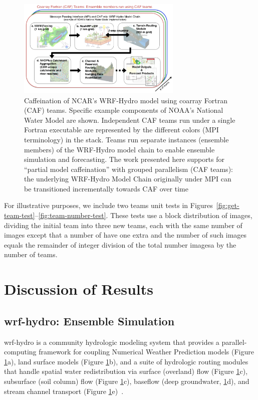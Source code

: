 \begin{figure}
\includegraphics[width=0.7\textwidth]{figures/WRF-Hydro-caf-ens-model_chain.png}
\vspace{-7pt}
\caption{Caffeination of NCAR's WRF-Hydro model using coarray Fortran (CAF)
  teams. Specific example components of  NOAA's National Water
  Model are shown. Independent CAF teams run under a single Fortran executable are represented by the different colors
  (MPI terminology) in the stack.  Teams run separate instances
  (ensemble members) of the WRF-Hydro model chain to enable ensemble
  simulation and forecasting. The work presented  here supports for ``partial model caffeination'' with grouped
  parallelism (CAF teams): the underlying WRF-Hydro Model Chain
  originally under MPI can be transitioned incrementally towards CAF
  over time\label{fig:caffeinate-wrf-hydro}}
\end{figure}
%

For illustrative purposes, we include two teams unit tests in
Figures~\ref{fig:get-team-test}--\ref{fig:team-number-test}.  These tests use a block distribution of images,
dividing the initial team into three new teams, each with the same number of images except that a number of
have one extra and the number of such images equals the remainder of integer division of the total
number imagesa by the number of teams.

\section{Discussion of Results}\label{sec:discussion}
\subsection{\gls{wrf-hydro}: Ensemble Simulation}
\gls{wrf-hydro} is a community hydrologic modeling system that provides a parallel-computing
framework for coupling Numerical Weather Prediction models (Figure \ref{fig:caffeinate-wrf-hydro}a), land surface models
(Figure \ref{fig:caffeinate-wrf-hydro}b), and a suite of hydrologic routing modules that handle spatial water redistribution
via surface (overland) flow (Figure \ref{fig:caffeinate-wrf-hydro}c), subsurface (soil column) flow (Figure \ref{fig:caffeinate-wrf-hydro}c),
baseflow (deep groundwater, \ref{fig:caffeinate-wrf-hydro}d), and stream channel transport
(Figure \ref{fig:caffeinate-wrf-hydro}e)~\cite{gochisEtal2014}.


